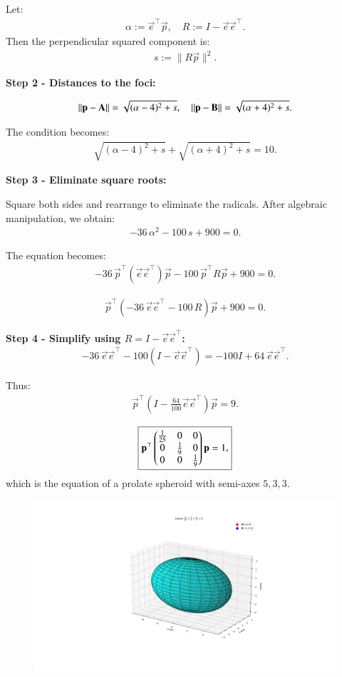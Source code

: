 \documentclass[journal]{IEEEtran}
\begin{document}
Let:
\begin{align}
\alpha := \vec{e}^\top \vec{p}, \quad
R := I - \vec{e}\vec{e}^\top.
\end{align}
Then the perpendicular squared component is:
\begin{align}
s := \|R\vec{p}\|^2.
\end{align}

\textbf{Step 2 - Distances to the foci:}

\begin{align}
\left\lVert\mathbf{p}-\mathbf{A}\right\rVert
= \sqrt{(\alpha - 4)^2 + s}, \quad
\left\lVert\mathbf{p}-\mathbf{B}\right\rVert
= \sqrt{(\alpha + 4)^2 + s}.
\end{align}

The condition becomes:
\begin{align}
\sqrt{(\alpha - 4)^2 + s} + \sqrt{(\alpha + 4)^2 + s} = 10.
\end{align}

\textbf{Step 3 - Eliminate square roots:}

Square both sides and rearrange to eliminate the radicals.
After algebraic manipulation, we obtain:
\begin{align}
-36\,\alpha^2 - 100\,s + 900 = 0.
\end{align}

The equation becomes:
\begin{align}
-36\,\vec{p}^\top (\vec{e}\vec{e}^\top) \vec{p}
- 100\,\vec{p}^\top R \vec{p}
+ 900 = 0.
\end{align}

\begin{align}
\vec{p}^\top\left(
-36\,\vec{e}\vec{e}^\top - 100\,R
\right)\vec{p} + 900 = 0.
\end{align}

\textbf{Step 4 - Simplify using $R = I - \vec{e}\vec{e}^\top$:}
\begin{align}
-36\,\vec{e}\vec{e}^\top - 100(I - \vec{e}\vec{e}^\top)
= -100I + 64\,\vec{e}\vec{e}^\top.
\end{align}

Thus:
\begin{align}
\vec{p}^\top\left(
I - \frac{64}{100}\vec{e}\vec{e}^\top
\right)\vec{p} = 9.
\end{align}

\begin{align}
\boxed{
\mathbf{p}^\top
\begin{pmatrix}
\tfrac{1}{25} & 0 & 0 \\ 
0 & \tfrac{1}{9} & 0 \\ 
0 & 0 & \tfrac{1}{9}
\end{pmatrix}
\mathbf{p} = 1,
}
\end{align}
which is the equation of a prolate spheroid with semi-axes $5,3,3$.

\begin{figure}[H]
    \centering
    \includegraphics[width=1\linewidth]{figs/plot9.png}
    \caption{}
    \label{fig:placeholder}
\end{figure}
\end{document}
